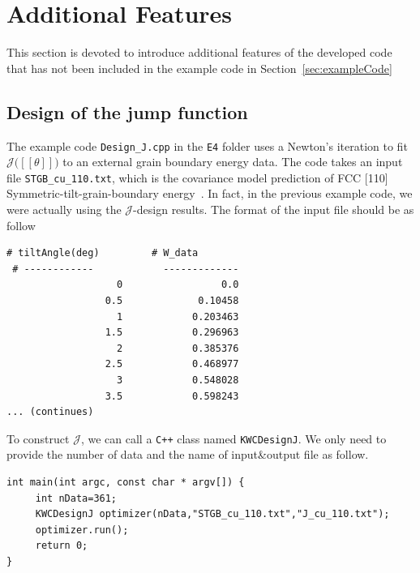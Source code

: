 \documentclass[11pt]{article}
\begin{document}
\section{Additional Features}

This section is devoted to introduce 
additional features of the developed code
that has not been included in the example code in Section~\ref{sec:exampleCode}

\subsection{Design of the jump function}

The example code \texttt{Design\_J.cpp} in the \texttt{E4} folder 
uses a Newton's iteration 
to fit $\mathcal{J}\big( [\![ \theta]\!]\big)$ to an external grain boundary energy data. 
The code takes an input file \texttt{STGB\_cu\_110.txt},
which is the covariance model prediction of FCC [110] Symmetric-tilt-grain-boundary energy~\cite{Runnels:2016_1,Runnels:2016_2}. 
In fact, in the previous example code, we were actually using the $\mathcal{J}$-design results.
The format of the input file should be as follow\\

\begin{tcolorbox}[colback=white]
\begin{lstlisting}[basicstyle=\footnotesize]
 # tiltAngle(deg)         # W_data
 # ------------            -------------  
                   0        	     0.0
                 0.5             0.10458
                   1            0.203463
                 1.5            0.296963
                   2            0.385376
                 2.5            0.468977
                   3            0.548028
                 3.5            0.598243
... (continues)
\end{lstlisting}
\end{tcolorbox}       

To construct $\mathcal{J}$, we can call
a \texttt{C++} class named \texttt{KWCDesignJ}. 
We only need to provide the number of data and the name of input\&output file as follow.\\

\begin{tcolorbox}
\begin{lstlisting}[basicstyle=\footnotesize]
int main(int argc, const char * argv[]) {
     int nData=361;
     KWCDesignJ optimizer(nData,"STGB_cu_110.txt","J_cu_110.txt");
     optimizer.run(); 
     return 0;
}
\end{lstlisting}
\end{tcolorbox}
\end{document}
